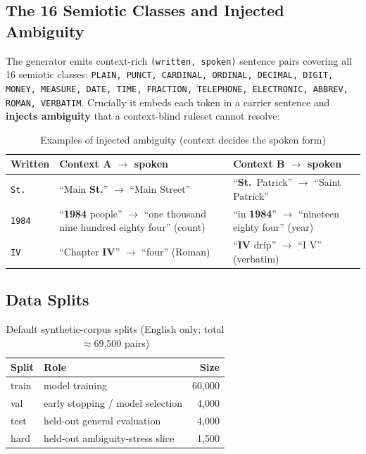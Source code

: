 \documentclass[12pt,a4paper]{article}
\begin{document}
\subsection{The 16 Semiotic Classes and Injected Ambiguity}

The generator emits context-rich \texttt{(written, spoken)} sentence pairs covering all 16 semiotic classes: \texttt{PLAIN, PUNCT, CARDINAL, ORDINAL, DECIMAL, DIGIT, MONEY, MEASURE, DATE, TIME, FRACTION, TELEPHONE, ELECTRONIC, ABBREV, ROMAN, VERBATIM}. Crucially it embeds each token in a carrier sentence and \textbf{injects ambiguity} that a context-blind ruleset cannot resolve:

\begin{table}[H]
\centering
\caption{Examples of injected ambiguity (context decides the spoken form)}
\small
\begin{tabularx}{\linewidth}{@{} l L L @{}}
\toprule
\textbf{Written} & \textbf{Context A $\rightarrow$ spoken} & \textbf{Context B $\rightarrow$ spoken} \\
\midrule
\texttt{St.} & ``Main \textbf{St.}'' $\rightarrow$ ``Main Street'' & ``\textbf{St.}\ Patrick'' $\rightarrow$ ``Saint Patrick'' \\
\texttt{1984} & ``\textbf{1984} people'' $\rightarrow$ ``one thousand nine hundred eighty four'' (count) & ``in \textbf{1984}'' $\rightarrow$ ``nineteen eighty four'' (year) \\
\texttt{IV} & ``Chapter \textbf{IV}'' $\rightarrow$ ``four'' (Roman) & ``\textbf{IV} drip'' $\rightarrow$ ``I V'' (verbatim) \\
\bottomrule
\end{tabularx}
\end{table}

\subsection{Data Splits}

\begin{table}[H]
\centering
\caption{Default synthetic-corpus splits (English only; total $\approx$69,500 pairs)}
\begin{tabular}{llr}
\toprule
\textbf{Split} & \textbf{Role} & \textbf{Size} \\
\midrule
train & model training & 60,000 \\
val & early stopping / model selection & 4,000 \\
test & held-out general evaluation & 4,000 \\
hard & held-out ambiguity-stress slice & 1,500 \\
\bottomrule
\end{tabular}
\end{table}
\end{document}
